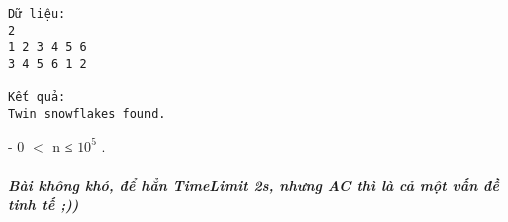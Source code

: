 \begin{verbatim}
Dữ liệu:
2
1 2 3 4 5 6
3 4 5 6 1 2

Kết quả:
Twin snowflakes found.
\end{verbatim}
- 0 $<$ n ≤ $10^{5}$   .  

\paragraph{\textit{    Bài không khó, để hẳn TimeLimit 2s, nhưng AC thì là cả một vấn đề tinh tế ;))   }}